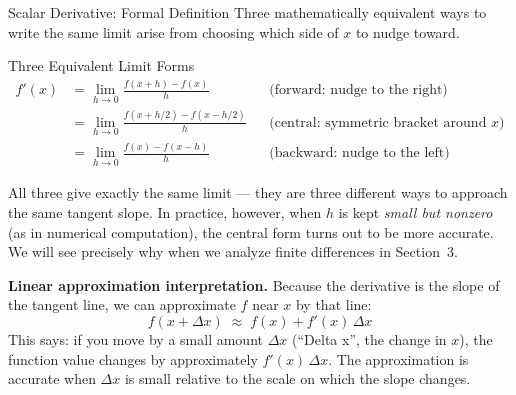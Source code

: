 \documentclass[aspectratio=169,10pt]{beamer}
\begin{document}
\begin{frame}[allowframebreaks]{Scalar Derivative: Formal Definition}
  Three mathematically equivalent ways to write the same limit arise from
  choosing which side of $x$ to nudge toward.

  \begin{block}{Three Equivalent Limit Forms}
    \begin{align*}
      f'(x) &= \lim_{h\to 0}\frac{f(x+h)-f(x)}{h}
               & & \text{(forward: nudge to the right)} \\[6pt]
             &= \lim_{h\to 0}\frac{f(x+h/2)-f(x-h/2)}{h}
               & & \text{(central: symmetric bracket around }x\text{)} \\[6pt]
             &= \lim_{h\to 0}\frac{f(x)-f(x-h)}{h}
               & & \text{(backward: nudge to the left)}
    \end{align*}
  \end{block}

  All three give exactly the same limit --- they are three different ways to
  approach the same tangent slope.  In practice, however, when $h$ is
  kept \emph{small but nonzero} (as in numerical computation), the central
  form turns out to be more accurate.  We will see precisely why when we
  analyze finite differences in Section~3.

  \medskip
  \textbf{Linear approximation interpretation.}
  Because the derivative is the slope of the tangent line, we can
  approximate $f$ near $x$ by that line:
  \[
    f(x + \Delta x) \;\approx\; f(x) + f'(x)\,\Delta x
  \]
  This says: if you move by a small amount $\Delta x$ (``Delta x'',
  the change in $x$), the function value changes by approximately
  $f'(x)\,\Delta x$.  The approximation is accurate when $\Delta x$ is
  small relative to the scale on which the slope changes.

\end{frame}
\end{document}
